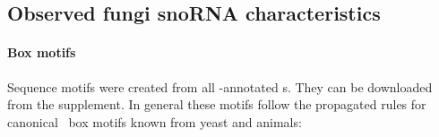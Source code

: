 %

\subsection{Observed fungi snoRNA characteristics}

\paragraph{\textbf{Box motifs}} Sequence motifs were created from all \snostrip-annotated \sno s. They can be downloaded from the supplement.
In general these motifs follow the propagated rules for canonical \sno\ box motifs known from yeast and animals: 

